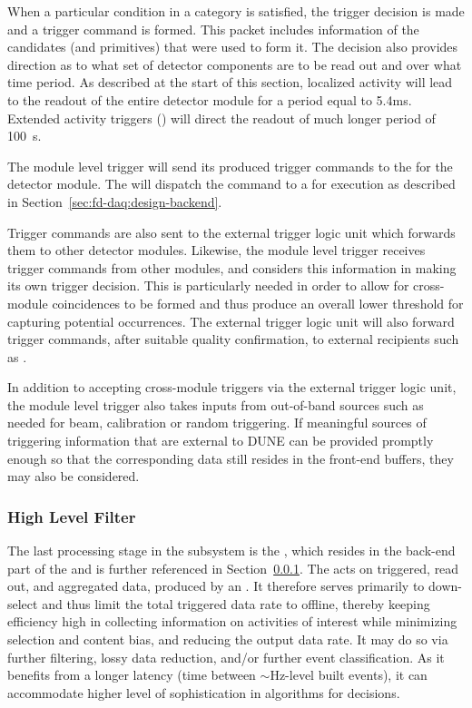 When a particular condition in a category is satisfied, the trigger
decision is made and a trigger command is formed. 
This packet includes information of the candidates (and primitives)
that were used to form it. 
The decision also provides direction as to what set of detector components
are to be read out and over what time period.
As described at the start of this section, localized activity will lead
to the readout of the entire detector module for a period equal to 5.4\si{\milli\second}.  Extended activity triggers () will
direct the readout of much longer period of \SI{100}{s}.

The module level trigger will send its produced trigger commands to the
 for the detector module.  The
 will dispatch the command to a  for
execution as described in Section~\ref{sec:fd-daq:design-backend}.

Trigger commands are also sent to the external trigger logic unit which
forwards them to other detector modules. Likewise, the module level
trigger receives trigger commands from other modules, and considers
this information in making its own trigger decision.
This is particularly needed in order to allow for cross-module
coincidences to be formed and thus produce an overall lower threshold for
capturing potential  occurrences. 
The external trigger logic unit will also forward  trigger
commands, after suitable quality confirmation, to external recipients
such as .

In addition to accepting cross-module triggers via the external trigger
logic unit, the module level trigger also takes inputs from out-of-band sources such as
needed for beam, calibration or random triggering. 
If meaningful sources of triggering information that are external to
DUNE can be provided promptly enough so that the corresponding data
still resides in the front-end buffers, they may also be considered.


\subsubsection{High Level Filter}
\label{sec:fd-daq:design-data-reduction}

The last processing stage in the  subsystem is the
, which resides in the back-end part of the  and
is further referenced in Section~\ref{sec:fd-daq:design-data-reduction}.
The  acts on triggered, read out, and aggregated data,
produced by an . 
It therefore serves primarily to down-select and thus
limit the total triggered data rate to offline, thereby keeping %
efficiency high in collecting information on activities of interest
while minimizing selection and content bias, and reducing the output data
rate. It may do so via 
further filtering, lossy data reduction, and/or further event
classification. As it benefits from a longer latency (time between
$\sim$Hz-level built events), it can accommodate higher level of
sophistication in algorithms for  decisions.

